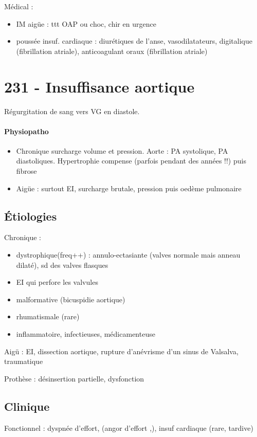 Médical :
\begin{itemize}
  \item IM aigüe : ttt OAP ou choc, chir en urgence
  \item poussée insuf. cardiaque : diurétiques de l'anse, vasodilatateurs,
    digitalique (fibrillation atriale), anticoagulant oraux (fibrillation
    atriale)
\end{itemize}

\section{231 - Insuffisance aortique}%
\label{sec:231_insuffisance_aortique}
Régurgitation de sang vers VG en diastole.

\paragraph{Physiopatho} 
\begin{itemize}
  \item Chronique
surcharge volume et pression. Aorte : \inc
PA systolique, \dec PA diastoliques. 
Hypertrophie compense (parfois pendant des années !!) puis fibrose
\item Aigüe : surtout \gls{EI}, surcharge brutale,
  \inc pression puis oedème pulmonaire
\end{itemize}

\subsection{Étiologies}
Chronique :
\begin{itemize}
  \item dystrophique(freq++) : annulo-ectasiante (valves normale mais anneau
    dilaté), sd des valves flasques
  \item EI qui perfore les valvules
  \item malformative (bicuspidie aortique)
  \item rhumatismale (rare)
  \item inflammatoire, infectieuses, médicamenteuse
\end{itemize}
Aigü : EI, dissection aortique, rupture d'anévrisme d'un sinus de Valsalva,
traumatique

Prothèse : désinsertion partielle, dysfonction

\subsection{Clinique}
Fonctionnel : dyspnée d'effort, (angor d'effort ,), insuf cardiaque (rare,
tardive)

